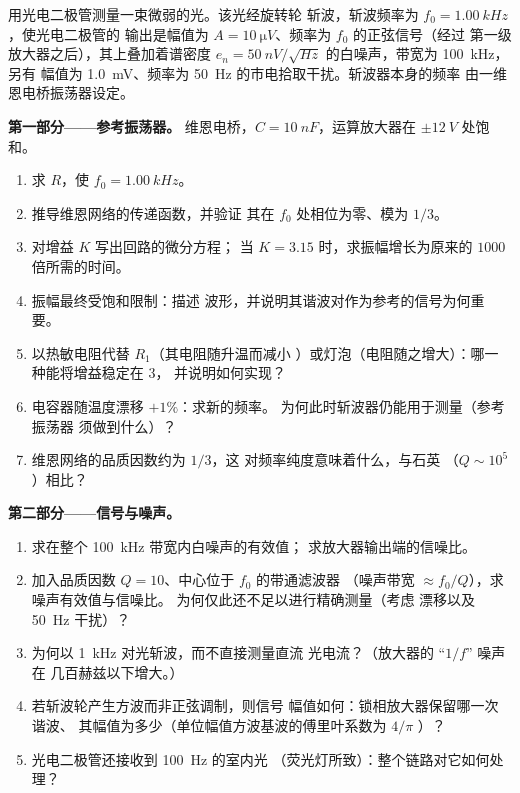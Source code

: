 \begin{problem}
\label{pb:b2:feedback-oscillators:1}

用光电二极管测量一束微弱的光。该光经旋转轮
斩波，斩波频率为 $f_0 = \qty{1.00}{kHz}$，使光电二极管的
输出是幅值为 $A = \qty{10}{\micro V}$、频率为 $f_0$ 的正弦信号（经过
第一级放大器之后），其上叠加着谱密度
$e_n = \qty{50}{nV/\sqrt{Hz}}$ 的白噪声，带宽为 \qty{100}{kHz}，另有
幅值为 \qty{1.0}{mV}、频率为 \qty{50}{Hz} 的市电拾取干扰。斩波器本身的频率
由一维恩电桥振荡器设定。

\medskip
\noindent\textbf{第一部分——参考振荡器。}
维恩电桥，$C = \qty{10}{nF}$，运算放大器在 $\pm\qty{12}{V}$ 处饱和。
\begin{enumerate}
  \item 求 $R$，使 $f_0 = \qty{1.00}{kHz}$。
  \item 推导维恩网络的传递函数，并验证
        其在 $f_0$ 处相位为零、模为 $1/3$。
  \item 对增益 $K$ 写出回路的微分方程；
        当 $K = 3.15$ 时，求振幅增长为原来的 $1000$ 倍所需的时间。
  \item 振幅最终受饱和限制：描述
        波形，并说明其谐波对作为参考的信号为何重要。
  \item 以热敏电阻代替 $R_1$（其电阻随升温而减小
        ）或灯泡（电阻随之增大）：哪一种能将增益稳定在 3，
        并说明如何实现？
  \item 电容器随温度漂移 $+1\%$：求新的频率。
        为何此时斩波器仍能用于测量（参考振荡器
        须做到什么）？
  \item 维恩网络的品质因数约为 $1/3$，这
        对频率纯度意味着什么，与石英
        （$Q \sim 10^5$）相比？
\end{enumerate}

\medskip
\noindent\textbf{第二部分——信号与噪声。}
\begin{enumerate}[resume]
  \item 求在整个 \qty{100}{kHz} 带宽内白噪声的有效值；
        求放大器输出端的信噪比。
  \item 加入品质因数 $Q = 10$、中心位于 $f_0$ 的带通滤波器
        （噪声带宽 $\approx f_0/Q$），求噪声有效值与信噪比。
        为何仅此还不足以进行精确测量（考虑
        漂移以及 \qty{50}{Hz} 干扰）？
  \item 为何以 \qty{1}{kHz} 对光斩波，而不直接测量直流
        光电流？（放大器的 “$1/f$” 噪声在
        几百赫兹以下增大。）
  \item 若斩波轮产生方波而非正弦调制，则信号
        幅值如何：锁相放大器保留哪一次谐波、
        其幅值为多少（单位幅值方波基波的傅里叶系数为 $4/\pi$
        ）？
  \item 光电二极管还接收到 \qty{100}{Hz} 的室内光
        （荧光灯所致）：整个链路对它如何处理？
\end{enumerate}


\end{problem}
